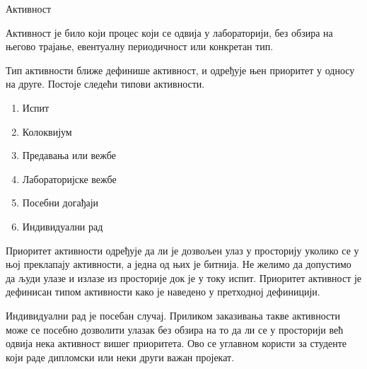 \documentclass[a4paper, 12pt, diplomski]{etfcyr}
\makeatletter
\newcommand{\indentfirstparagraphoff}{
    \renewenvironment{justify}{%
        \trivlist
        \justifying
        \item\relax
    }{
        \endtrivlist
    }
}
\gdef\tshortstack{\@ifnextchar[\@tshortstack{\@tshortstack[c]}}
\let\@tshortstack\@shortstack
\makeatother
\begin{document}
   		\begin{labeling}{\smash{\tshortstack[l]{Корисник\\лабораторије}}}
            \indentfirstparagraphoff            
            
            \item [Активност] 
                \begin{justify}
                    Активност је било који процес који се одвија у лабораторији, без обзира на његово трајање, евентуалну периодичност или конкретан тип.
                \end{justify}

            \item[\smash{\tshortstack[l]{Тип\\активности}}]
                \begin{justify}
                   Тип активности ближе дефинише активност, и одређује њен приоритет у односу на друге. Постоје следећи типови активности.
                   \begin{enumerate}[noitemsep]
                       \item Испит
                       \item Колоквијум
                       \item Предавања или вежбе
                       \item Лабораторијске вежбе
                       \item Посебни догађаји
                       \item Индивидуални рад
                    \end{enumerate}
                \end{justify}

            \item[\smash{\tshortstack[l]{Приоритет\\активности}}]
                \begin{justify}
                Приоритет активности одређује да ли је дозвољен улаз у просторију уколико се у њој преклапају активности, а једна од њих је битнија. Не желимо да допустимо да људи улазе и излазе из просторије док је у току испит. Приоритет активност је дефинисан типом активности како је наведено у претходној дефиницији.

                \indent Индивидуални рад је посебан случај. Приликом заказивања такве активности може се посебно дозволити улазак без обзира на то да ли се у просторији већ одвија нека активност вишег приоритета. Ово се углавном користи за студенте који раде дипломски или неки други важан пројекат.
                

\end{justify}
\end{labeling}
\end{document}
